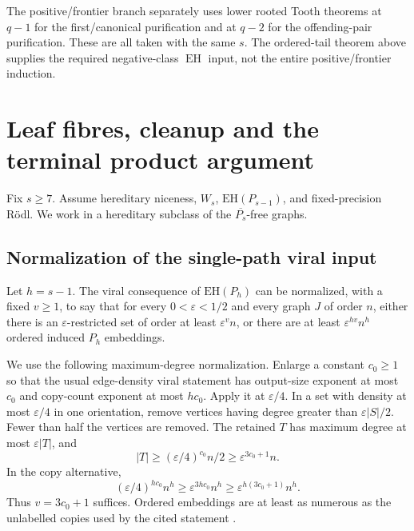 \documentclass[11pt,a4paper]{article}
\theoremstyle{definition}
\theoremstyle{remark}
\numberwithin{equation}{section}
\newcommand{\EH}{\mathrm{EH}}
\begin{document}
The positive/frontier branch separately uses lower rooted Tooth theorems at \(q-1\) for the first/canonical purification and at \(q-2\) for the offending-pair purification. These are all taken with the same \(s\). The ordered-tail theorem above supplies the required negative-class \(\operatorname{EH}\) input, not the entire positive/frontier induction.

\section{Leaf fibres, cleanup and the terminal product argument}\label{app:terminal}
Fix \(s\ge7\). Assume hereditary niceness, \(W_s\), \(\EH(P_{s-1})\), and fixed-precision R\"odl. We work in a hereditary subclass of the \(\overline{P_s}\)-free graphs.

\subsection{Normalization of the single-path viral input}
Let \(h=s-1\). The viral consequence of \(\EH(P_h)\) can be normalized, with a fixed \(v\ge1\), to say that for every \(0<\varepsilon<1/2\) and every graph \(J\) of order \(n\), either there is an \(\varepsilon\)-restricted set of order at least \(\varepsilon^v n\), or there are at least \(\varepsilon^{hv}n^h\) ordered induced \(P_h\) embeddings.

We use the following maximum-degree normalization. Enlarge a constant \(c_0\ge1\) so that the usual edge-density viral statement has output-size exponent at most \(c_0\) and copy-count exponent at most \(hc_0\). Apply it at \(\varepsilon/4\). In a set with density at most \(\varepsilon/4\) in one orientation, remove vertices having degree greater than \(\varepsilon|S|/2\). Fewer than half the vertices are removed. The retained \(T\) has maximum degree at most \(\varepsilon|T|\), and
\[
 |T|\ge (\varepsilon/4)^{c_0}n/2\ge\varepsilon^{3c_0+1}n.
\]
In the copy alternative,
\[
 (\varepsilon/4)^{hc_0}n^h\ge\varepsilon^{3hc_0}n^h
 \ge\varepsilon^{h(3c_0+1)}n^h.
\]
Thus \(v=3c_0+1\) suffices. Ordered embeddings are at least as numerous as the unlabelled copies used by the cited statement \cite{bfp}.
\end{document}
